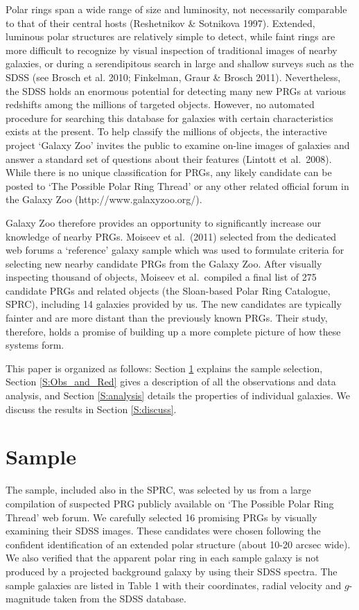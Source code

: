 \documentclass[useAMS,usenatbib]{mn2e}
\begin{document}
Polar rings span a wide range of size and luminosity, not necessarily comparable to that of their central hosts (Reshetnikov \& Sotnikova 1997). Extended, luminous polar structures are relatively simple to detect, while faint rings are more difficult to recognize by visual inspection of traditional images of nearby galaxies, or during a serendipitous search in large and shallow surveys such as the SDSS (see Brosch et al. 2010; Finkelman, Graur \& Brosch 2011). 
Nevertheless, the SDSS holds an enormous potential for detecting many new PRGs at various redshifts among the millions of targeted objects.
However, no automated procedure for searching this database for galaxies with certain characteristics exists at the present. 
To help classify the millions of objects, the interactive project `Galaxy Zoo' invites the public to examine on-line images of galaxies and answer a standard set of questions about their features (Lintott et al.\ 2008).
While there is no unique classification for PRGs, any likely candidate can be posted to `The Possible Polar Ring Thread' or any other related official forum in the Galaxy Zoo (http://www.galaxyzoo.org/). 

Galaxy Zoo therefore provides an opportunity to significantly increase our knowledge of nearby PRGs.
Moiseev et al.\ (2011) selected from the dedicated web forums a `reference' galaxy sample which was used to formulate criteria for selecting new nearby candidate PRGs from the Galaxy Zoo. 
After visually inspecting thousand of objects, Moiseev et al.\ compiled a final list of 275 candidate PRGs and related objects (the Sloan-based Polar Ring Catalogue, SPRC), including 14 galaxies provided by us.
The new candidates are typically fainter and are more distant than the previously known PRGs.
Their study, therefore, holds a promise of building up a more complete picture of how these systems form.

This paper is organized as follows: Section \ref{S:sample} explains the sample selection, Section \ref{S:Obs_and_Red}
gives a description of all the observations and data analysis, and Section \ref{S:analysis} details the properties of individual galaxies. We discuss the results in Section \ref{S:discuss}.

\section{Sample}
\label{S:sample}
The sample, included also in the SPRC, was selected by us from a large compilation of suspected PRG publicly available on `The Possible Polar Ring Thread' web forum. 
We carefully selected 16 promising PRGs by visually
examining their SDSS images. These candidates were chosen following the confident identification
of an extended polar structure (about 10-20 arcsec wide). 
We also verified that the apparent polar ring in each
sample galaxy is not produced by a projected background galaxy by using their SDSS spectra. 
The sample galaxies are listed in Table 1 with their coordinates, radial velocity and $g$-magnitude taken from the SDSS database.
\end{document}
